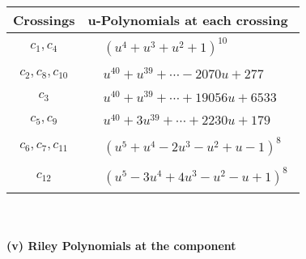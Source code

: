 \documentclass[1p]{elsarticle_modified}
\theoremstyle{definition}
\begin{document}
\begin{tabular}{m{50pt}|m{274pt}}
Crossings & \hspace{64pt}u-Polynomials at each crossing \\
\hline $$\begin{aligned}c_{1},c_{4}\end{aligned}$$&$\begin{aligned}
&(u^4+u^3+u^2+1)^{10}
\end{aligned}$\\
\hline $$\begin{aligned}c_{2},c_{8},c_{10}\end{aligned}$$&$\begin{aligned}
&u^{40}+u^{39}+\cdots-2070 u+277
\end{aligned}$\\
\hline $$\begin{aligned}c_{3}\end{aligned}$$&$\begin{aligned}
&u^{40}+u^{39}+\cdots+19056 u+6533
\end{aligned}$\\
\hline $$\begin{aligned}c_{5},c_{9}\end{aligned}$$&$\begin{aligned}
&u^{40}+3 u^{39}+\cdots+2230 u+179
\end{aligned}$\\
\hline $$\begin{aligned}c_{6},c_{7},c_{11}\end{aligned}$$&$\begin{aligned}
&(u^5+u^4-2 u^3- u^2+u-1)^8
\end{aligned}$\\
\hline $$\begin{aligned}c_{12}\end{aligned}$$&$\begin{aligned}
&(u^5-3 u^4+4 u^3- u^2- u+1)^8
\end{aligned}$\\
\hline
\end{tabular}\\~\\
\newpage\renewcommand{\arraystretch}{1}
\flushleft \textbf{(v) Riley Polynomials at the component}\newline \\
\end{document}
